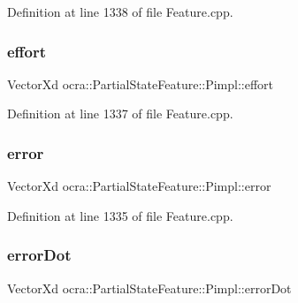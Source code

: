 Definition at line 1338 of file Feature.\+cpp.

\hypertarget{structocra_1_1PartialStateFeature_1_1Pimpl_a9339429835a3f17dc250ebcb1a417de8}{}\label{structocra_1_1PartialStateFeature_1_1Pimpl_a9339429835a3f17dc250ebcb1a417de8} 
\subsubsection{\texorpdfstring{effort}{effort}}
{\footnotesize\ttfamily Vector\+Xd ocra\+::\+Partial\+State\+Feature\+::\+Pimpl\+::effort}



Definition at line 1337 of file Feature.\+cpp.

\hypertarget{structocra_1_1PartialStateFeature_1_1Pimpl_a92618339173100da4f1759fca1c5de69}{}\label{structocra_1_1PartialStateFeature_1_1Pimpl_a92618339173100da4f1759fca1c5de69} 
\subsubsection{\texorpdfstring{error}{error}}
{\footnotesize\ttfamily Vector\+Xd ocra\+::\+Partial\+State\+Feature\+::\+Pimpl\+::error}



Definition at line 1335 of file Feature.\+cpp.

\hypertarget{structocra_1_1PartialStateFeature_1_1Pimpl_a761ba2024bc9792be9d3317ac0e7006e}{}\label{structocra_1_1PartialStateFeature_1_1Pimpl_a761ba2024bc9792be9d3317ac0e7006e} 
\subsubsection{\texorpdfstring{error\+Dot}{errorDot}}
{\footnotesize\ttfamily Vector\+Xd ocra\+::\+Partial\+State\+Feature\+::\+Pimpl\+::error\+Dot}



